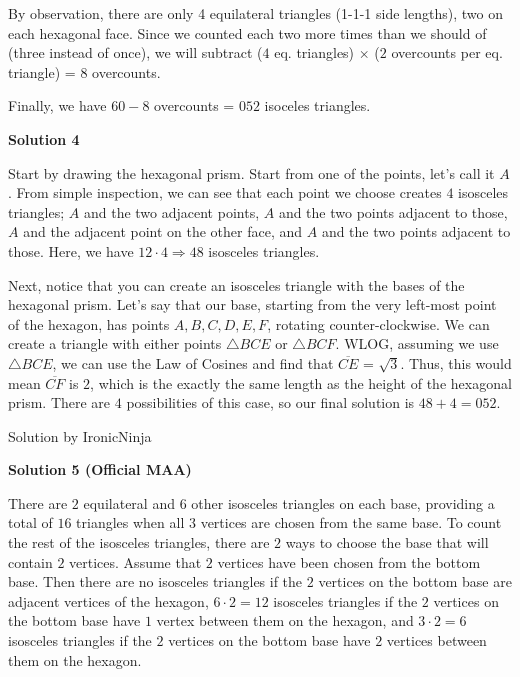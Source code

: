 \begin{enumerate}
 By observation, there are only 4 equilateral triangles (1-1-1 side lengths), two on each hexagonal face. Since we counted each two more times than we should of (three instead of once), we will subtract ($4$ eq. triangles) $\times$ ($2$ overcounts per eq. triangle) = $8$ overcounts.

 Finally, we have $60 - 8$ overcounts = $\boxed{052}$ isoceles triangles.

 



\textbf{Solution 4}

Start by drawing the hexagonal prism. Start from one of the points, let's call it $A$. From simple inspection, we can see that each point we choose creates $4$ isosceles triangles; $A$ and the two adjacent points, $A$ and the two points adjacent to those, $A$ and the adjacent point on the other face, and $A$ and the two points adjacent to those. Here, we have $12\cdot4\Rightarrow48$ isosceles triangles.

 Next, notice that you can create an isosceles triangle with the bases of the hexagonal prism. Let's say that our base, starting from the very left-most point of the hexagon, has points $A, B, C, D, E, F$, rotating counter-clockwise. We can create a triangle with either points $\bigtriangleup{BCE}$ or $\bigtriangleup{BCF}$. WLOG, assuming we use $\bigtriangleup{BCE}$, we can use the Law of Cosines and find that $\overline{CE}$ = $\sqrt{3}$. Thus, this would mean $\overline{CF}$ is $2$, which is the exactly the same length as the height of the hexagonal prism. There are $4$ possibilities of this case, so our final solution is $48+4=\boxed{052}$.

 Solution by IronicNinja~

 



\textbf{Solution 5 (Official MAA)}

There are $2$ equilateral and $6$ other isosceles triangles on each base, providing a total of $16$ triangles when all $3$ vertices are chosen from the same base. To count the rest of the isosceles triangles, there are $2$ ways to choose the base that will contain $2$ vertices. Assume that $2$ vertices have been chosen from the bottom base. Then there are no isosceles triangles if the $2$ vertices on the bottom base are adjacent vertices of the hexagon, $6\cdot 2=12$ isosceles triangles if the $2$ vertices on the bottom base have $1$ vertex between them on the hexagon, and $3\cdot2=6$ isosceles triangles if the $2$ vertices on the bottom base have $2$ vertices between them on the hexagon.


\end{enumerate}

